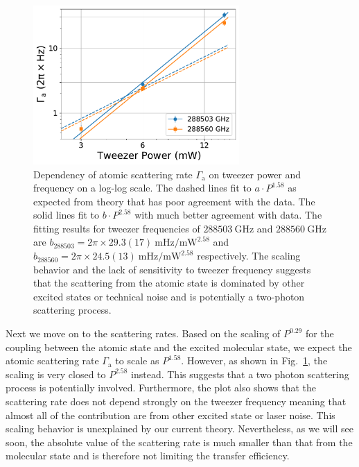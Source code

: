 \begin{figure}
  \centering
  \includegraphics[width=0.7\textwidth]{figures/raman_transfer_scatter_scaling_atom.pdf}
  \caption[Atomic scattering rate as a function of tweezer power and frequency]{
    Dependency of atomic scattering rate $\Gamma_{\mathrm{a}}$
    on tweezer power and frequency on a log-log scale.
    The dashed lines fit to $a\cdot P^{1.58}$ as expected from theory
    that has poor agreement with the data.
    The solid lines fit to $b\cdot P^{2.58}$ with much better agreement with data.
    The fitting results for tweezer frequencies of
    $288503~\mathrm{GHz}$ and $288560~\mathrm{GHz}$ are
    $b_{288503}=2\pi\times29.3(17)~\mathrm{mHz/mW^{2.58}}$
    and $b_{288560}=2\pi\times24.5(13)~\mathrm{mHz/mW^{2.58}}$ respectively.
    The scaling behavior and the lack of sensitivity to tweezer frequency
    suggests that the scattering from the atomic state is dominated
    by other excited states or technical noise
    and is potentially a two-photon scattering process.
    \label{fig:raman-transfer:results:scaling:gamma-atom}}
\end{figure}

Next we move on to the scattering rates.
Based on the scaling of $P^{0.29}$ for the coupling
between the atomic state and the excited molecular state,
we expect the atomic scattering rate $\Gamma_{\mathrm{a}}$ to scale as $P^{1.58}$.
However, as shown in Fig.~\ref{fig:raman-transfer:results:scaling:gamma-atom},
the scaling is very closed to $P^{2.58}$ instead.
This suggests that a two photon scattering process is potentially involved.
Furthermore, the plot also shows that the scattering rate does not depend strongly
on the tweezer frequency meaning that almost all of the contribution
are from other excited state or laser noise.
This scaling behavior is unexplained by our current theory.
Nevertheless, as we will see soon, the absolute value of the scattering rate
is much smaller than that from the molecular state
and is therefore not limiting the transfer efficiency.

